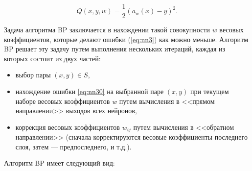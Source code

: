 \begin{equation}
	\label{eq:nn30}
	Q(x, y, w) = \frac{1}{2}(a_w(x)-y)^2.
\end{equation}

Задача алгоритма BP заключается в нахождении такой совокупности $w$ весовых коэффициентов, которые делают ошибки (\ref*{eq:nn3}) как можно меньше. Алгоритм BP решает эту задачу путем
выполнения нескольких итераций, каждая из которых состоит из двух частей:

\begin{itemize}
    \item выбор пары $(x, y) \in S$,
    \item нахождение ошибки \ref*{eq:nn30} на выбранной паре $(x, y)$ при текущем наборе весовых коэффициентов $w$ путем вычисления в <<прямом направлении>> выходов всех нейронов,
    \item коррекция весовых коэффициентов $w_{ij}$ путем вычисления в <<обратном направлении>> (сначала корректируются весовые коэффициенты последнего слоя, затем --- предпоследнего, и т.д.).
\end{itemize}

Алгоритм BP имеет следующий вид:

